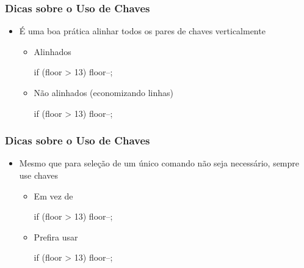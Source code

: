 \documentclass[xcolor={dvipsnames,table},aspectratio=169]{beamer}
\begin{document}
\begin{frame}[fragile]\frametitle{Dicas sobre o Uso de Chaves}
\begin{itemize}
	\item É uma boa prática alinhar todos os pares de chaves verticalmente
	\begin{itemize}
		\item Alinhados
\begin{javacode}
if (floor > 13)
{
   floor--;
}
\end{javacode}
		\item Não alinhados (economizando linhas)
\begin{javacode}
if (floor > 13) {
   floor--;
}
\end{javacode}
	\end{itemize}
\end{itemize}
\end{frame}

\begin{frame}[fragile]\frametitle{Dicas sobre o Uso de Chaves}
\begin{itemize}
	\item Mesmo que para seleção de um único comando não seja necessário, sempre use chaves
	\begin{itemize}
		\item Em vez de
\begin{javacode}
if (floor > 13)
   floor--;
\end{javacode}
		\item Prefira usar
\begin{javacode}
if (floor > 13)
{
   floor--;
}
\end{javacode}
	\end{itemize}
\end{itemize}
\end{frame}
\end{document}
